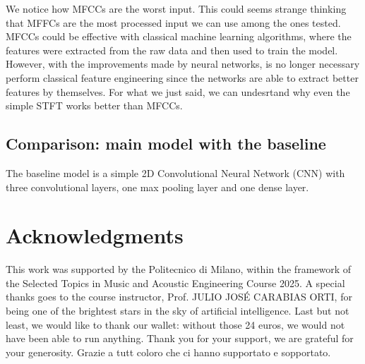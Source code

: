 \documentclass{article}
\begin{document}
\begin{sloppy}
We notice how MFCCs are the worst input. This could seems strange thinking that MFFCs are the most processed input we can use among the ones tested.
MFCCs could be effective with classical machine learning algorithms, where the features were extracted from the raw data and then used to train the model.
However, with the improvements made by neural networks, is no longer necessary perform classical feature engineering since the networks
are able to extract better features by themselves. For what we just said, we can undesrtand why even the simple
STFT works better than MFCCs.

\subsection{Comparison: main model with the baseline}
\label{sec:comparison_2}
The baseline model is a simple 2D Convolutional Neural Network (CNN) with three convolutional layers, one max pooling layer and one dense layer.
\section{Acknowledgments}
\label{sec:ack}


This work was supported by the Politecnico di Milano,
within the framework of the Selected Topics in Music and Acoustic Engineering Course 2025.
A special thanks goes to the course instructor, Prof. JULIO JOSÉ CARABIAS ORTI, for being
one of the brightest stars in the sky of artificial intelligence.
Last but not least, we would like to thank our wallet: without those 24 euros, we would not have been able to run anything.
Thank you for your support, we are grateful for your generosity.
Grazie a tutt coloro che ci hanno supportato e sopportato.



\end{sloppy}
\end{document}

